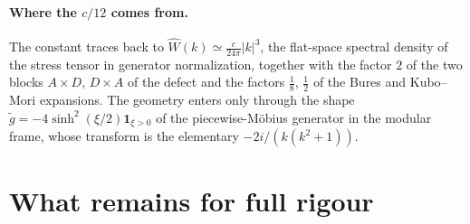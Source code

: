 \documentclass[11pt]{article}
\theoremstyle{accent}
\theoremstyle{definition}
\newcommand{\Wh}{\widehat W}
\newcommand{\gt}{\widetilde g}
\begin{document}
\paragraph{Where the \(c/12\) comes from.}
The constant traces back to \(\Wh(k)\simeq\frac{c}{24\pi}|k|^3\), the flat-space spectral density of the stress tensor in generator normalization, together with the factor \(2\) of the two blocks \(A\times D\), \(D\times A\) of the defect and the factors \(\frac18\), \(\frac12\) of the Bures and Kubo--Mori expansions.  The geometry enters only through the shape \(\gt=-4\sinh^2(\xi/2)\mathbf 1_{\xi>0}\) of the piecewise-M\"obius generator in the modular frame, whose transform is the elementary \(-2i/(k(k^2+1))\).

\section{What remains for full rigour}\label{sec:remains}
\end{document}
